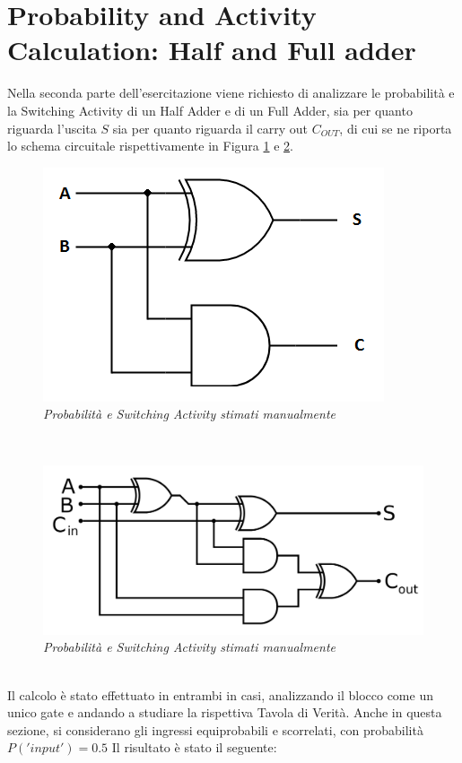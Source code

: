 \section{Probability and Activity Calculation: Half and Full adder}
Nella seconda parte dell'esercitazione viene richiesto di analizzare le probabilità e la Switching Activity di un Half Adder e di un Full Adder, sia per quanto riguarda l'uscita $S$ sia per quanto riguarda il carry out $C_{OUT}$, di cui se ne riporta lo schema circuitale rispettivamente in Figura \ref{half_adder} e \ref{full_adder}.
\begin{figure}[!htb]
	\centering
	\includegraphics[scale=0.4]{immagini/half_adder}
	\caption{\textit{Probabilità e Switching Activity stimati manualmente}}
	\label{half_adder}
\end{figure} \\
\begin{figure}[!htb]
	\centering
	\includegraphics[scale=0.2]{immagini/full_adder}
	\caption{\textit{Probabilità e Switching Activity stimati manualmente}}
	\label{full_adder}
\end{figure} \\
Il calcolo è stato effettuato in entrambi in casi, analizzando il blocco come un unico gate e andando a studiare la rispettiva Tavola di Verità. Anche in questa sezione, si considerano gli ingressi equiprobabili e scorrelati, con probabilità $P('input')=0.5$ Il risultato è stato il seguente:\\
